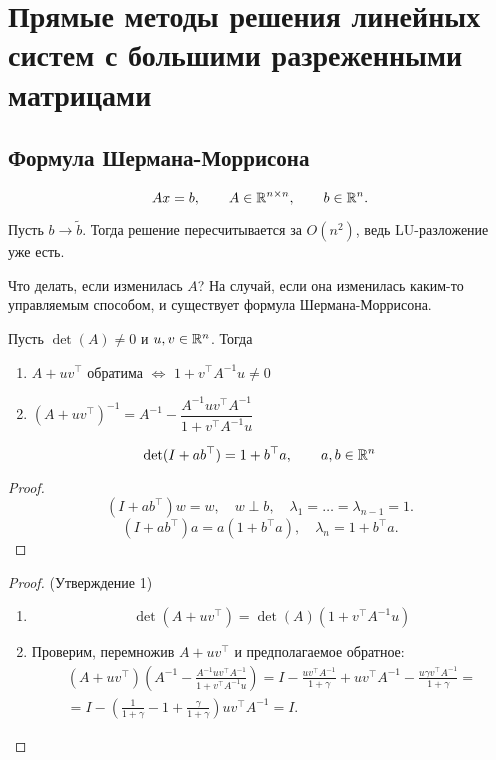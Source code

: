 \section{Прямые методы решения линейных систем с большими разреженными
матрицами}

\subsection{Формула Шермана-Моррисона}

\[
    A x = b, \qquad A \in \mathbb{R}^{n \times n}, \qquad b \in \mathbb{R}^n.
\]

Пусть $b \to \tilde{b}$. Тогда решение пересчитывается за $O(n^2)$, ведь
LU-разложение уже есть.

Что делать, если изменилась $A$? На случай, если она изменилась каким-то
управляемым способом, и существует формула Шермана-Моррисона.

\begin{point}
    Пусть $\det(A) \ne 0$ и $u, v \in \mathbb{R}^n$. Тогда

    \begin{enumerate}
        \item $A + u v^\top$ обратима $\Leftrightarrow$
            $1 + v^\top A^{-1} u \ne 0$
        \item $(A + u v^\top)^{-1} = A^{-1}
            - \dfrac{A^{-1} u v^\top A^{-1}}{1 + v^\top A^{-1} u}$
    \end{enumerate}
\end{point}

\begin{lemma}
    \[
        \det(I + a b^\top) = 1 + b^\top a, \qquad a, b \in \mathbb{R}^n
    \]
\end{lemma}

\begin{proof}
    \[
        (I + a b^\top) w = w, \quad w \perp b,
        \quad \lambda_1 = \dots = \lambda_{n - 1} = 1.
    \]
    \[
        (I + a b^\top) a = a (1 + b^\top a), \quad \lambda_n = 1 + b^\top a.
    \]
\end{proof}

\begin{proof} (Утверждение 1)
    \begin{enumerate}
        \item \[ \det(A + u v^\top) = \det(A) (1 + v^\top A^{-1} u) \]
        \item Проверим, перемножив $A + u v^\top$ и предполагаемое обратное:
            \begin{multline*}
                (A + u v^\top) \left( A^{-1}
                - \frac{A^{-1} u v^\top A^{-1}}{1 + v^\top A^{-1} u} \right)
                = I - \frac{u v^\top A^{-1}}{1 + \gamma} + u v^\top A^{-1}
                - \frac{u \gamma v^\top A^{-1}}{1 + \gamma}
                =\\= I - \left( \frac{1}{1 + \gamma} - 1
                    + \frac{\gamma}{1 + \gamma} \right) u v^\top A^{-1}
                = I.
            \end{multline*}
    \end{enumerate}
\end{proof}

